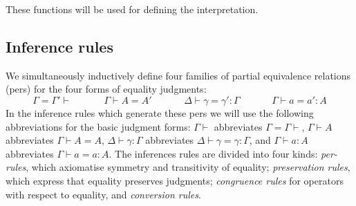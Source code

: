 \documentclass{lmcs}
\begin{document}
These functions will be used for defining the interpretation.

\subsection{Inference rules}
We simultaneously inductively define four families of partial equivalence relations (pers) for the
four forms of equality judgments:
\[
\Gamma = \Gamma' \vdash \hspace{40pt} \Gamma \vdash A = A' \hspace{40pt}
\Delta \vdash \gamma = \gamma' : \Gamma \hspace{40pt} \Gamma \vdash a = a' : A
\]
In the inference rules which generate these pers we will use the following abbreviations for the basic judgment forms:
$\Gamma \vdash$ abbreviates $\Gamma = \Gamma \vdash$, 
$\Gamma \vdash A$ abbreviates $\Gamma \vdash A = A$,
$\Delta \vdash \gamma : \Gamma$ abbreviates  $\Delta \vdash \gamma = \gamma : \Gamma$, and 
$\Gamma \vdash a : A$ abbreviates $\Gamma \vdash a = a : A
$. The inferences rules are divided into four kinds: \emph{per-rules}, which axiomatise symmetry and
transitivity of equality; \emph{preservation rules}, which express that equality preserves
judgments; \emph{congruence rules} for operators with respect to equality, and \emph{conversion
rules}.

\begin{figure}
  \centering
{}
  \label{fig:cwf1}
\end{figure}
\end{document}
